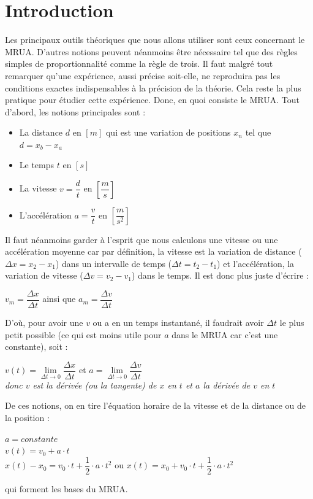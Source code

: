 \documentclass[11pt]{article}
\begin{document}
\section{Introduction}
Les principaux outils théoriques que nous allons utiliser sont ceux concernant le MRUA. D’autres notions peuvent néanmoins être nécessaire tel que des règles simples de proportionnalité comme la règle de trois. Il faut malgré tout remarquer qu’une expérience, aussi précise soit-elle, ne reproduira pas les conditions exactes indispensables à la précision de la théorie. Cela reste la plus pratique pour étudier cette  expérience.
Donc, en quoi consiste le MRUA. Tout d’abord, les notions principales sont :
\begin{itemize}
    \item La distance $d$ en $[m]$ qui est une variation de positions $x_n$ tel que $d=x_b-x_a$ 
    \item Le temps $t$ en $[s]$
    \item La vitesse $v=\dfrac{d}{t}$ en $\left[\dfrac{m}{s} \right] $ 
    \item L’accélération $a=\dfrac{v}{t}$ en $\left[\dfrac{m}{s^2} \right] $ 
\end{itemize}
Il faut néanmoins garder à l’esprit que nous calculons une vitesse ou une accélération moyenne car par définition, la vitesse est la variation de distance ($\Delta x = x_2-x_1$) dans un intervalle de temps ($\Delta t = t_2-t_1$) et l’accélération, la variation de vitesse ($\Delta v = v_2-v_1$) dans le temps. Il est donc plus juste d’écrire :\\
 \begin{center}
 $v_m =\dfrac{\Delta x}{\Delta t} $ ainsi que $a_m =\dfrac{\Delta v}{\Delta t} $
 \end{center} 
D’où, pour avoir une $v$ ou a en un temps instantané, il faudrait avoir $ \Delta t$ le plus petit possible (ce qui est moins utile pour $a$ dans le MRUA car c’est une constante), soit :\\
\begin{center}
 $v(t)=\lim\limits_{\Delta t \to 0} \dfrac{\Delta x}{\Delta t} $ et $a =\lim\limits_{\Delta t \to 0} \dfrac{\Delta v}{\Delta t}$ \\
\textit{donc $v$ est la dérivée (ou la tangente) de $x$ en $t$ et $a$ la dérivée de $v$ en $t$}\\
 \end{center} 
De ces notions, on en tire l’équation horaire de la vitesse et de la distance ou de la position :
\begin{center}
$a=constante $\\
$v(t)= v_0+a \cdot t $\\
$x(t)-x_0=v_0 \cdot t + \dfrac{1}{2} \cdot a \cdot t^2 $ ou $x(t)=x_0+v_0 \cdot t + \dfrac{1}{2} \cdot a \cdot t^2 $
\end{center} 
qui forment les bases du MRUA.
\clearpage
\end{document}
